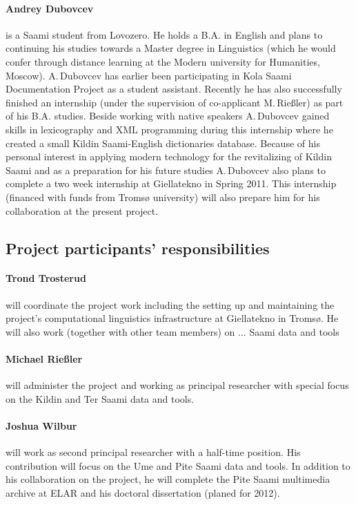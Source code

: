 \documentclass[a4paper,12pt]{article}
\begin{document}
{{{{\paragraph{Andrey Dubovcev} is a Saami student from Lovozero. He holds a B.A. in English and plans to continuing his studies towards a Master degree in Linguistics (which he would confer through distance learning at the Modern university for Humanities, Moscow). A.\,Dubovcev has earlier been participating in Kola Saami Documentation Project as a student assistant. Recently he has also successfully finished an internship (under the supervision of co-applicant M.\,Rießler) as part of his B.A. studies. Beside working with native speakers A.\,Dubovcev gained skills in lexicography and XML programming during this internship where he created a small Kildin Saami-English dictionaries database. Because of his personal interest in applying modern technology for the revitalizing of Kildin Saami and as a preparation for his future studies A.\,Dubovcev also plans to complete a two week internship at Giellatekno in Spring 2011. This internship (financed with funds from Tromsø university) will also prepare him for his collaboration at the present  project.

\subsection{Project participants' responsibilities}

\paragraph{Trond Trosterud} will coordinate the project work including the setting up and maintaining the project's computational linguistics infrastructure at Giellatekno in Tromsø. He will also work (together with other team members) on ... Saami data and tools

\paragraph{Michael Rießler} will administer the project and working as principal researcher with special focus on the Kildin and Ter Saami data and tools.%

\paragraph{Joshua Wilbur} will work as second principal researcher with a half-time position. His contribution will focus on the Ume and Pite Saami data and tools. In addition to his collaboration on the project, he will complete the Pite Saami multimedia archive at ELAR and his doctoral dissertation (planed for 2012).

}}}}
\end{document}
